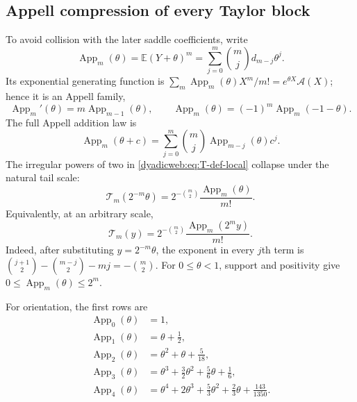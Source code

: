 \documentclass[11pt,oneside]{article}
\theoremstyle{definition}
\theoremstyle{remark}
\newcommand{\E}{\mathbb E}
\begin{document}
\subsection{Appell compression of every Taylor block}

To avoid collision with the later saddle coefficients, write
\begin{equation}
 \operatorname{App}_m(\theta)=\E(Y+\theta)^m
 =\sum_{j=0}^{m}\binom mjd_{m-j}\theta^j.
 \label{dyadicweb:eq:Appell-definition}
\end{equation}
Its exponential generating function is
$\sum_m\operatorname{App}_m(\theta)X^m/m!=e^{\theta X}\mathscr A(X)$;
hence it is an Appell family,
\begin{equation}
 \operatorname{App}_m'(\theta)=m\operatorname{App}_{m-1}(\theta),\qquad
 \operatorname{App}_m(\theta)=(-1)^m\operatorname{App}_m(-1-\theta).
 \label{dyadicweb:eq:Appell-identities}
\end{equation}
The full Appell addition law is
\begin{equation}
 \operatorname{App}_m(\theta+c)
 =\sum_{j=0}^{m}\binom mj\operatorname{App}_{m-j}(\theta)c^j.
 \label{dyadicq:eq:Appell-addition}
\end{equation}
The irregular powers of two in \eqref{dyadicweb:eq:T-def-local} collapse under the natural
tail scale:
\begin{equation}
 \boxed{
 \mathcal T_m(2^{-m}\theta)
 =2^{-\binom m2}\frac{\operatorname{App}_m(\theta)}{m!}.}
 \label{dyadicweb:eq:Appell-compression}
\end{equation}
Equivalently, at an arbitrary scale,
\begin{equation}
 \mathcal T_m(y)=2^{-\binom m2}
 \frac{\operatorname{App}_m(2^my)}{m!}.                  \label{dyadicq:eq:R-Appell-general}
\end{equation}
Indeed, after substituting $y=2^{-m}\theta$, the exponent in every $j$th term is
$\binom{j+1}{2}-\binom{m-j}{2}-mj=-\binom m2$.
For $0\le\theta<1$, support and positivity give
$0\le\operatorname{App}_m(\theta)\le2^m$.

For orientation, the first rows are
\begin{align*}
 \operatorname{App}_0(\theta)&=1,\\
 \operatorname{App}_1(\theta)&=\theta+\frac12,\\
 \operatorname{App}_2(\theta)&=\theta^2+\theta+\frac5{18},\\
 \operatorname{App}_3(\theta)&=\theta^3+\frac32\theta^2+\frac56\theta+\frac16,\\
 \operatorname{App}_4(\theta)&=\theta^4+2\theta^3+\frac53\theta^2
              +\frac23\theta+\frac{143}{1350}.
\end{align*}
\end{document}
